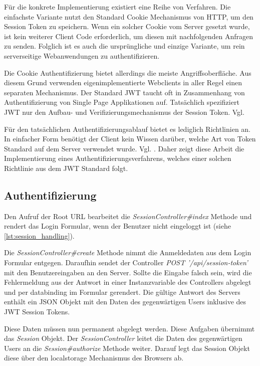 Für die konkrete Implementierung existiert eine Reihe von Verfahren. Die einfachste Variante nutzt den Standard Cookie Mechanismus von HTTP, um den Session Token zu speichern. Wenn ein solcher Cookie vom Server gesetzt wurde, ist kein weiterer Client Code erforderlich, um diesen mit nachfolgenden Anfragen zu senden. Folglich ist es auch die ursprüngliche und einzige Variante, um rein serverseitige Webanwendungen zu authentifizieren.

Die Cookie Authentifizierung bietet allerdings die meiste Angriffsoberfläche. Aus diesem Grund verwenden eigenimplementierte Webclients in aller Regel einen separaten Mechanismus. Der Standard JWT taucht oft in Zusammenhang von Authentifizierung von Single Page Applikationen auf. Tatsächlich spezifiziert JWT nur den Aufbau- und Verifizierungsmechanismus der Session Token. Vgl. \cite[Kap. 1]{Peyrott:2018}

Für den tatsächlichen Authentifizierungsablauf bietet es lediglich Richtlinien an. In einfacher Form benötigt der Client kein Wissen darüber, welche Art von Token Standard auf dem Server verwendet wurde. Vgl. \cite[Kap. 2.2]{Peyrott:2018}. Daher zeigt diese Arbeit die Implementierung eines Authentifizierungsverfahrens, welches einer solchen Richtlinie aus dem JWT Standard folgt.

\subsection{Authentifizierung}

Den Aufruf der Root URL bearbeitet die \textit{SessionController\#index} Methode und rendert das Login Formular, wenn der Benutzer nicht eingeloggt ist (siehe \ref{lst:session_handling}).

Die \textit{SessionController\#create} Methode nimmt die Anmeldedaten aus dem Login Formular entgegen. Daraufhin sendet der Controller \textit{POST '/api/session-token'} mit den Benutzereingaben an den Server. Sollte die Eingabe falsch sein, wird die Fehlermeldung aus der Antwort in einer Instanzvariable des Controllers abgelegt und per \gls{databinding} im Formular gerendert. Die gültige Antwort des Servers enthält ein JSON Objekt mit den Daten des gegenwärtigen Users inklusive des JWT Session Tokens.

Diese Daten müssen nun permanent abgelegt werden. Diese Aufgaben übernimmt das \textit{Session} Objekt. Der \textit{SessionController} leitet die Daten des gegenwärtigen Users an die \textit{Session\#authorize} Methode weiter. Darauf legt das Session Objekt diese über den \gls{localstorage} Mechanismus des Browsers ab.

